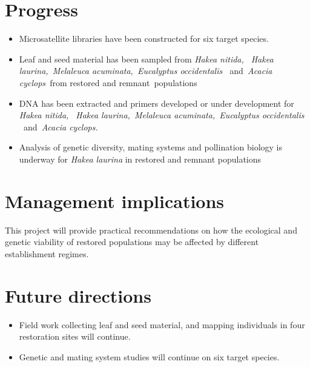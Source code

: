 \documentclass[version=last,
    paper=a4, %
    10pt, %
    usenames,
    dvipsnames,
    oneside, %
    headings=openany, %
    DIV=15 %
]{scrbook}
\begin{document}
\section*{Progress}
\begin{itemize}
\itemsep1pt\parskip0pt
\item
  Microsatellite libraries have been constructed for six target species.
\item
  Leaf and seed material has been sampled from \emph{Hakea nitida,~}
  \emph{Hakea laurina,~Melaleuca acuminata,~Eucalyptus occidentalis
  ~}and\emph{~}\emph{Acacia cyclops~}from restored and
  remnant~populations
\item
  DNA has been extracted and primers developed or under development for
  \emph{Hakea nitida,~} \emph{Hakea laurina,~Melaleuca
  acuminata,~Eucalyptus occidentalis ~}and\emph{~}\emph{Acacia cyclops.}
\item
  Analysis of genetic diversity, mating systems and pollination biology
  is underway for \emph{Hakea laurina} in restored and remnant
  populations
\end{itemize}



\section*{Management implications}
This project will provide practical recommendations on how the
ecological and genetic viability of restored populations may be affected
by different establishment regimes.



\section*{Future directions}
\begin{itemize}
\itemsep1pt\parskip0pt
\item
  Field work collecting leaf and seed material, and mapping individuals
  in four restoration sites will continue.
\item
  Genetic and mating system studies will continue on six target species.
\end{itemize}



\end{document}
